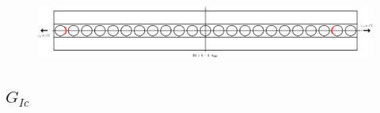 \documentclass[first,firstsupp,lastsupp,last,hyperref,table]{ETHclass}
\begin{document}
\begin{frame}
\begin{columns}[c]
\begin{column}{0.5\textwidth}
\begin{figure}
\end{figure}
\end{column}
\end{columns}
\begin{figure}
\centering
\includegraphics[width=\textwidth]{twofibers-sameside-crackshielding21-thin.pdf}
\end{figure}
\end{frame}

\subsection{$G_{Ic}$}
\end{document}
